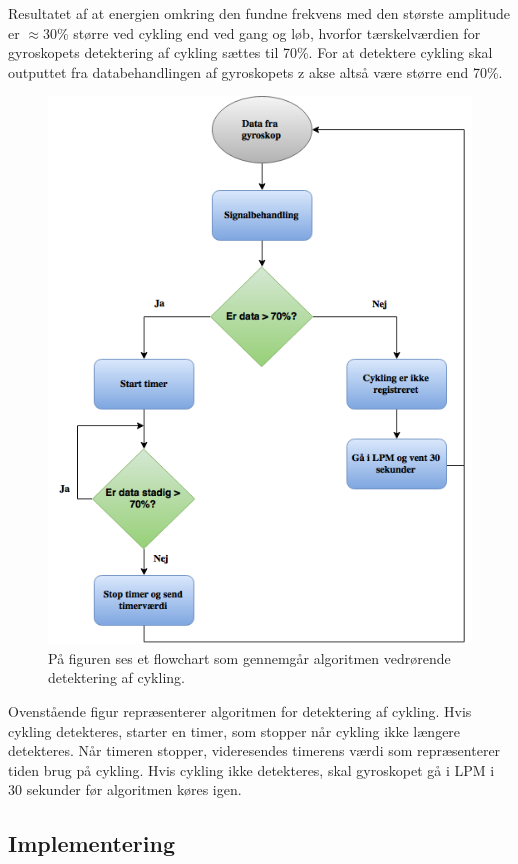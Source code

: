 Resultatet af at energien omkring den fundne frekvens med den største amplitude er $\approx$30\% større ved cykling end ved gang og løb, hvorfor tærskelværdien for gyroskopets detektering af cykling sættes til 70\%. For at detektere cykling skal outputtet fra databehandlingen af gyroskopets z akse altså være større end 70\%.
\begin{figure}[H]
	\centering
	\includegraphics[scale=0.6]{figures/cDesign/algoritme_cykling.png}
	\caption{På figuren ses et flowchart som gennemgår algoritmen vedrørende detektering af cykling.}
	\label{fig:algoritme_cykling}
\end{figure}
Ovenstående figur repræsenterer algoritmen for detektering af cykling. Hvis cykling detekteres, starter en timer, som stopper når cykling ikke længere detekteres. Når timeren stopper, videresendes timerens værdi som repræsenterer tiden brug på cykling. Hvis cykling ikke detekteres, skal gyroskopet gå i LPM i 30 sekunder før algoritmen køres igen. 

\subsection{Implementering}
